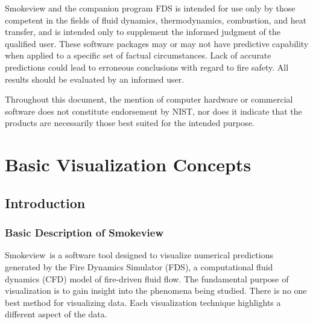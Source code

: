 \documentclass[11pt,twoside]{book}
\newcommand{\fds}{{FDS}}
\newcommand{\Smokeview}{{Smokeview}}
\begin{document}
Smokeview and the companion program FDS is intended for use only
by those competent in the fields of fluid dynamics,
thermodynamics, combustion, and heat transfer, and is intended
only to supplement the informed judgment of the qualified user.
These software packages may or may not have predictive capability
when applied to a specific set of factual circumstances. Lack of
accurate predictions could lead to erroneous conclusions with
regard to fire safety. All results should be evaluated by an
informed user.

Throughout this document, the mention of computer hardware or
commercial software does not constitute endorsement by NIST,
nor does
it indicate that the products are necessarily those
best suited for the
intended purpose.

%
%



\tableofcontents
\listoffigures

\mainmatter


%
%

\part{Basic Visualization Concepts}

%
%

\chapter{Introduction}
\section{Basic Description of Smokeview}
\Smokeview\ is a software tool designed to visualize numerical
predictions generated by the Fire Dynamics Simulator (\fds),
a computational fluid dynamics (CFD) model of fire-driven fluid
flow\cite{FDS_Tech_Guide_5}.  The fundamental purpose of visualization is to gain
insight into the phenomena being studied.  There is no one best method for visualizing data.
Each visualization technique highlights a different aspect of the data.
\end{document}
